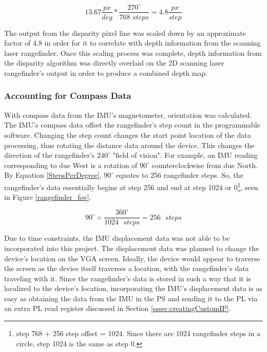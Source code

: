 \begin{equation} \label{yeeboi}
13.67\frac{px}{deg}*\frac{270^\circ}{768\,\,steps} = 4.8\frac{px}{step}
\end{equation}
\par
The output from the disparity pixel line was scaled down by an approximate factor of 4.8 in order for it to correlate with depth information from the scanning laser rangefinder. Once this scaling process was complete, depth information from the disparity algorithm was directly overlaid on the 2D scanning laser rangefinder's output in order to produce a combined depth map. 

\subsubsection{Accounting for Compass Data}
With compass data from the IMU's magnetometer, orientation was calculated. The IMU's compass data offset the rangefinder's step count in the programmable software. Changing the step count changes the start point location of the data processing, thus rotating the distance data around the device. This changes the direction of the rangefinder's $240^\circ$ "field of vision". For example, an IMU reading corresponding to due West is a rotation of $90^\circ$ counterclockwise from due North. By Equation \ref{StepsPerDegree}, $90^\circ$ equates to 256 rangefinder steps. So, the rangefinder's data essentially begins at step 256 and end at step 1024 or 0\footnote{step 768 + 256 step offset = 1024. Since there are 1024 rangefinder steps in a circle, step 1024 is the same as step 0.}, seen in Figure \ref{rangefinder_fov}.

\begin{equation}
	90^\circ \div \dfrac{360^\circ}{1024 \textrm{ } steps}  = 256 \textrm{ } steps
	\label{StepsPerDegree}
\end{equation}

\par
Due to time constraints, the IMU displacement data was not able to be incorporated into this project. The displacement data was planned to change the device's location on the VGA screen. Ideally, the device would appear to traverse the screen as the device itself traverses a location, with the rangefinder's data traveling with it. Since the rangefinder's data is stored in such a way that it is localized to the device's location, incorporating the IMU's displacement data is as easy as obtaining the data from the IMU in the PS and sending it to the PL via an extra PL read register discussed in Section \ref{sssec:creatingCustomIP}.



